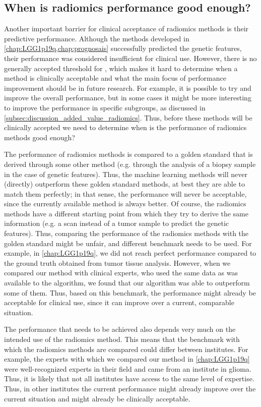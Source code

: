 \subsection{When is radiomics performance good enough?}\label{subsec:discussion_radiomics_performance}

Another important barrier for clinical acceptance of radiomics methods is their predictive performance.
Although the methods developed in \cref{chap:LGG1p19q,chap:prognosais} successfully predicted the genetic features, their performance was considered insufficient for clinical use.
However, there is no generally accepted threshold for , which makes it hard to determine when a method is clinically acceptable and what the main focus of performance improvement should be in future research.
For example, it is possible to try and improve the overall performance, but in some cases it might be more interesting to improve the performance in specific subgroups, as discussed in \cref{subsec:discussion_added_value_radiomics}.
Thus, before these methods will be clinically accepted we need to determine when is the performance of radiomics methods good enough?

The performance of radiomics methods is compared to a golden standard that is derived through some other method (e.g. through the analysis of a biopsy sample in the case of genetic features).
Thus, the machine learning methods will never (directly) outperform these golden standard methods, at best they are able to match them perfectly; in that sense, the performance will never be acceptable, since the currently available method is always better.
Of course, the radiomics methods have a different starting point from which they try to derive the same information (e.g. a scan instead of a tumor sample to predict the genetic features).
Thus, comparing the performance of the radiomics methods with the golden standard might be unfair, and  different benchmark needs to be used.
For example, in \cref{chap:LGG1p19q}, we did not reach perfect performance compared to the ground truth obtained from tumor tissue analysis.
However, when we compared our method with clinical experts, who used the same data as was available to the algorithm, we found that our algorithm was able to outperform some of them.
Thus, based on this benchmark, the performance might already be acceptable for clinical use, since it can improve over a current, comparable situation.

The performance that needs to be achieved also depends very much on the intended use of the radiomics method.
This means that the benchmark with which the radiomics methods are compared could differ between institutes.
For example, the experts with which we compared our method in \cref{chap:LGG1p19q} were well-recognized experts in their field and came from an institute   in glioma.
Thus, it is likely that not all institutes have access to the same level of expertise.
Thus, in other institutes the current performance might already improve over the current situation and might already be clinically acceptable.


